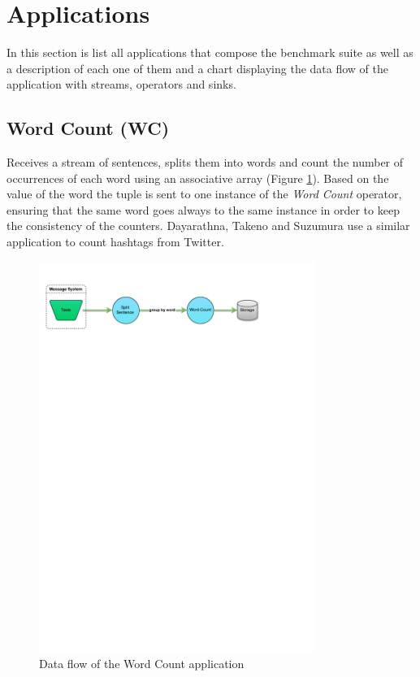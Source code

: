 \documentclass[ppgc,diss,english]{iiufrgs}
\begin{document}
\section{Applications}
\label{sec:applications}

In this section is list all applications that compose the benchmark suite as well as a description of each one of them and a chart displaying the data flow of the application with streams, operators and sinks.

\subsection{Word Count (WC)}

Receives a stream of sentences, splits them into words and count the number of occurrences of each word using an associative array (Figure \ref{fig:app_wordcount}). Based on the value of the word the tuple is sent to one instance of the \emph{Word Count} operator, ensuring that the same word goes always to the same instance in order to keep the consistency of the counters. Dayarathna, Takeno and Suzumura \cite{dayarathna2011performance} use a similar application to count hashtags from Twitter.

\begin{figure}[!ht]
	\centering
	\includegraphics[width=0.8\textwidth]{images/apps/WordCount.pdf}
	\caption{Data flow of the Word Count application}
	\label{fig:app_wordcount}
\end{figure}
\end{document}
